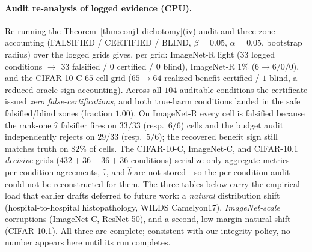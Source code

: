 \documentclass[conference]{IEEEtran}
\theoremstyle{plain}
\theoremstyle{definition}
\begin{document}
\paragraph{Audit re-analysis of logged evidence (CPU).} Re-running the
Theorem~\ref{thm:conj1-dichotomy}(iv) audit and three-zone accounting (FALSIFIED /
CERTIFIED / BLIND, $\beta{=}0.05$, $\alpha{=}0.05$, bootstrap radius) over the logged
grids gives, per grid: ImageNet-R light ($33$ logged conditions $\to$ $33$ falsified /
$0$ certified / $0$ blind), ImageNet-R $1\%$ ($6\to 6/0/0$), and the CIFAR-10-C
$65$-cell grid ($65\to 64$ realized-benefit certified / $1$ blind, a reduced
oracle-sign accounting). Across all $104$ auditable conditions the certificate issued
\emph{zero false-certifications}, and both true-harm conditions landed in the safe
falsified/blind zones (fraction $1.00$). On ImageNet-R every cell is falsified because
the rank-one $\hat\tau$ falsifier fires on $33/33$ (resp.\ $6/6$) cells and the budget
audit independently rejects on $29/33$ (resp.\ $5/6$); the recovered benefit sign still
matches truth on $82\%$ of cells. The CIFAR-10-C, ImageNet-C, and CIFAR-10.1
\emph{decisive} grids ($432{+}36{+}36{+}36$ conditions) serialize only aggregate
metrics---per-condition agreements, $\hat\tau$, and $\hat b$ are not stored---so the
per-condition audit could not be reconstructed for them.
The three tables below carry the empirical load that earlier drafts deferred to future work:
a \emph{natural} distribution shift (hospital-to-hospital histopathology, WILDS Camelyon17),
\emph{ImageNet-scale} corruptions (ImageNet-C, ResNet-50), and a second, low-margin natural
shift (CIFAR-10.1). All three are complete; consistent with our integrity policy, no number
appears here until its run completes.
\end{document}
